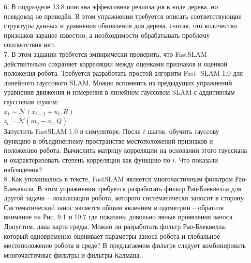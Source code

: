 \documentclass[10pt,a4paper]{article}
\begin{document}
6.	В подразделе 13.8 описана эффективная реализация в виде дерева, но псевдокод не приведён. В этом упражнении требуется описать соответствующие структуры данных и уравнения обновления для дерева, считая, что количество признаков заранее известно, а необходимости обрабатывать проблему соответствия нет.\\

7.	В этом задании требуется эмпирически проверить, что FastSLAM действительно сохраняет корреляции между оценками признаков и оценкой положения робота. Требуется разработать простой алгоритм Fast- SLAM 1.0 для линейного гауссового SLAM. Можно вспомнить из предыдущих упражнений уравнения движения и измерения в линейном гауссовом SLAM с аддитивным гауссовым шумом:\\

$x_t\sim\mathcal{N}(x_{t-1}+u_t,R)$\\

$z_t=\mathcal{N}(m_j-x_t,Q)$\\

Запустить FastSLAM 1.0 в симуляторе. После $t$ шагов, обучить гауссову функцию в объединённому пространстве местоположений признаков и положению робота. Вычислить матрицу корреляции на основании этого гауссиана и охарактеризовать степень корреляции как функцию по $t$. Что показали наблюдения?\\

8.	Как упоминалось в тексте, FastSLAM является многочастичным фильтром Рао-Блеквелла. В этом упражнении требуется разработать фильтр Рао-Блеквелла для другой задачи – локализации робота, которого систематически заносит в сторону. Систематический занос является общим явлением в одометрии – обратите внимание на Рис. 9.1 и 10.7 где показаны довольно явные проявления заноса. Допустим, дана карта среды. Можно ли разработать фильтр Рао-Блеквелла, который одновременно оценивает параметры заноса робота и глобальное местоположение робота в среде? В предлагаемом фильтре следует комбинировать многочастичные фильтры и фильтры Калмана.\\






 
\end{document}
